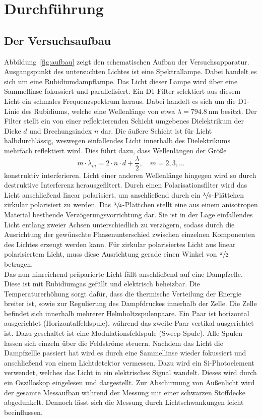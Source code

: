 \section{Durchführung}
\label{sec:durchführung}

\subsection{Der Versuchsaufbau}

Abbildung~\ref{fig:aufbau} zeigt den schematischen Aufbau der Versuchsapparatur.
Ausgangspunkt des untersuchten Lichtes ist eine Spektrallampe. Dabei handelt es
sich um eine Rubidiumdampflampe. Das Licht dieser Lampe wird über eine
Sammellinse fokussiert und parallelisiert. Ein D1-Filter selektiert aus diesem
Licht ein schmales Frequenzspektrum heraus. Dabei handelt es sich um die
D1-Linie des Rubidiums, welche eine Wellenlänge von etwa
$\lambda=\SI{794.8}{\nano\metre}$ besitzt. Der Filter stellt ein von einer
refĺektierenden Schicht umgebenes Dielektrikum der Dicke $d$ und
Brechungsindex $n$ dar. Die äußere Schicht ist für Licht halbdurchlässig,
weswegen einfallendes Licht innerhalb des Dielektrikums mehrfach reflektiert
wird. Dies führt dazu, dass Wellenlängen der Größe
%
\begin{equation}
  m\cdot\lambda_m=2\cdot n\cdot d+\frac{\lambda}{2}, \quad m=2,3,\ldots
\end{equation}
%
konstruktiv interferieren. Licht einer anderen Wellenlänge hingegen wird so
durch destruktive Interferenz herausgefiltert. Durch einen Polarisationsfilter
wird das Licht anschließend linear polarisiert, um anschließend durch ein
$\sfrac{\lambda}{4}$-Plättchen zirkular polarisiert zu werden. Das
$\sfrac{\lambda}{4}$-Plättchen stellt eine aus einem anisotropen Material
besthende Verzögerungsvorrichtung dar. Sie ist in der Lage einfallendes Licht
entlang zweier Achsen unterschiedlich zu verzögern, sodass durch die Ausrichtung
der gewünschte Phasenunterschied zwischen einzelnen Komponenten des Lichtes
erzeugt werden kann. Für zirkular polarisiertes Licht aus linear polarisiertem Licht,
muss diese Ausrichtung gerade einen Winkel von $\sfrac{\pi}{2}$ betragen. \\ Das
nun hinreichend präparierte Licht fällt anschließend auf eine Dampfzelle. Diese
ist mit Rubidiumgas gefüllt und elektrisch beheizbar. Die Temperaturerhöhung
sorgt dafür, dass die thermische Verteilung der Energie breiter ist, sowie zur
Regulierung des Dampfdruckes innerhalb der Zelle. Die Zelle befindet sich
innerhalb mehrerer Helmholtzspulenpaare. Ein Paar ist horizontal ausgerichtet
(Horizontalfeldspule), während das zweite Paar vertikal ausgerichtet ist. Dazu
geschaltet ist eine Modulationsfeldspule (Sweep-Spule). Alle Spulen lassen sich
einzeln über die Feldströme steuern. Nachdem das Licht die Dampfzellle passiert
hat wird es durch eine Sammellinse wieder fokussiert und anschließend von einem
Lichtdetektor vermessen. Dazu wird ein Si-Photoelement verwendet, welches das
Licht in ein elektrisches Signal wandelt. Dieses wird durch ein Oszilloskop
eingelesen und dargestellt. Zur Abschirmung von Außenlicht wird der gesamte
Messaufbau während der Messung mit einer schwarzen Stoffdecke abgedunkelt.
Dennoch lässt sich die Messung durch Lichtschwankungen leicht beeinflussen.

